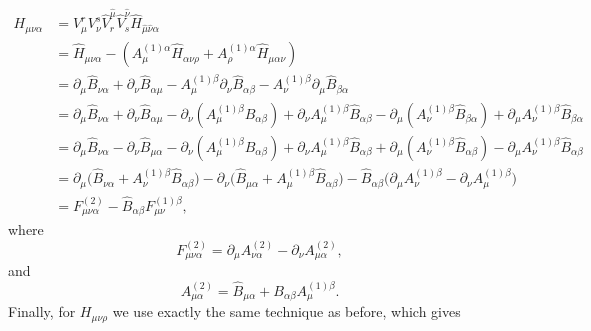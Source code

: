 \documentclass{article}
\begin{document}
\begin{equation}
    \begin{aligned}
        H_{\mu \nu \alpha} &= V^r_\mu V^s_\nu \hat V^{\hat \mu}_r \hat V^{\hat \nu}_s \hat H_{\hat \mu \hat \nu \alpha}\\
        & = \hat H_{\mu \nu \alpha } -(A^{(1)\alpha}_\mu \hat H_{\alpha  \nu \rho}+A^{(1)\alpha}_\rho \hat H_{ \mu \alpha  \nu })\\
        &= \partial_\mu \hat B_{\nu \alpha} +\partial_\nu \hat B_{\alpha \mu}  -A^{(1)\beta}_\mu \partial_\nu \hat B_{\alpha \beta} -A^{(1)\beta}_\nu \partial_\mu \hat B_{\beta \alpha} \\
        &=  \partial_\mu \hat B_{\nu \alpha} +\partial_\nu \hat B_{\alpha \mu} -\partial_\nu  (A^{(1)\beta}_\mu \hat B_{\alpha \beta})+\partial_\nu A^{(1)\beta}_\mu  \hat B_{\alpha \beta}-\partial_\mu (A^{(1)\beta}_\nu \hat B_{\beta \alpha}) + \partial_\mu A^{(1)\beta}_\nu  \hat B_{\beta \alpha}\\
        &= \partial_\mu \hat B_{\nu \alpha} -\partial_\nu \hat B_{ \mu \alpha } -\partial_\nu  (A^{(1)\beta}_\mu \hat B_{\alpha \beta})+\partial_\nu A^{(1)\beta}_\mu  \hat B_{\alpha \beta}+\partial_\mu (A^{(1)\beta}_\nu \hat B_{ \alpha \beta}) - \partial_\mu A^{(1)\beta}_\nu  \hat B_{ \alpha \beta}\\
        &= \partial_\mu\big( \hat B_{\nu \alpha} + A^{(1)\beta}_\nu \hat B_{ \alpha \beta}\big) - \partial_\nu\big( \hat B_{ \mu \alpha } + A^{(1)\beta}_\mu \hat B_{\alpha \beta}\big) - \hat B_{\alpha \beta}\big(\partial_\mu A^{(1)\beta}_\nu-\partial_\nu A^{(1)\beta}_\mu\big)\\
        &= F^{(2)}_{\mu \nu \alpha } - \hat B_{ \alpha \beta }F^{(1)\beta}_{\mu \nu},
    \end{aligned}
\end{equation}
where
\begin{equation*}
    F^{(2)}_{\mu \nu \alpha} = \partial_\mu A^{(2)}_{\nu \alpha} -\partial_\nu A^{(2)}_{\mu \alpha},
\end{equation*}
and 
\begin{equation*}
    A^{(2)}_{\mu \alpha} =\hat B_{\mu \alpha} + B_{\alpha \beta} A^{(1)\beta}_\mu.
\end{equation*}
Finally, for $H_{\mu \nu \rho}$ we use exactly the same technique as before, which gives
\end{document}
